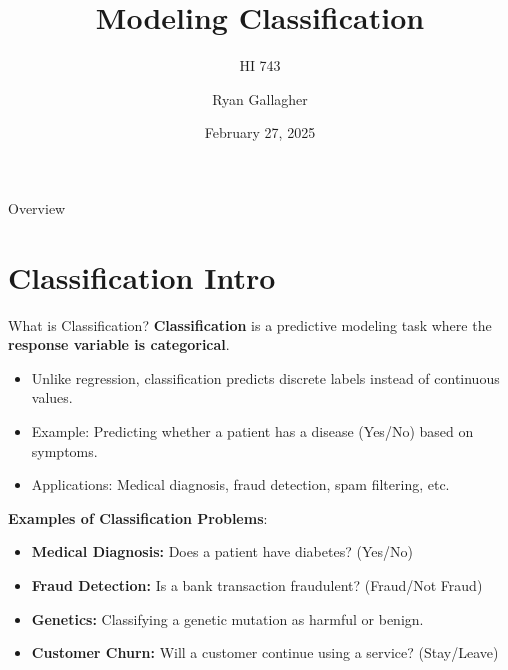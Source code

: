 \documentclass[aspectratio=169,xcolor=dvipsnames]{beamer}
\title{Modeling Classification}
\subtitle{HI 743}
\author{Ryan Gallagher}
\institute
{
    Department of Health Informatics and Administration \\
    Zilber College of Public Health \\
    University of Wisconsin - Milwaukee%
}
\date{February 27, 2025} %
\begin{document}
\begin{frame}
    \titlepage
\end{frame}


\begin{frame}{Overview}
    \tableofcontents
\end{frame}

\section{Classification Intro}
\begin{frame}{What is Classification?}
    \textbf{Classification} is a predictive modeling task where the \textbf{response variable is categorical}.
    \begin{itemize}
        \item Unlike regression, classification predicts discrete labels instead of continuous values.
        \item Example: Predicting whether a patient has a disease (Yes/No) based on symptoms.
        \item Applications: Medical diagnosis, fraud detection, spam filtering, etc.
    \end{itemize}
    \bigskip
    \textbf{Examples of Classification Problems}:
        \begin{itemize}
        \item \textbf{Medical Diagnosis:} Does a patient have diabetes? (Yes/No)
        \item \textbf{Fraud Detection:} Is a bank transaction fraudulent? (Fraud/Not Fraud)
        \item \textbf{Genetics:} Classifying a genetic mutation as harmful or benign.
        \item \textbf{Customer Churn:} Will a customer continue using a service? (Stay/Leave)
    \end{itemize}
\end{frame}
\end{document}
